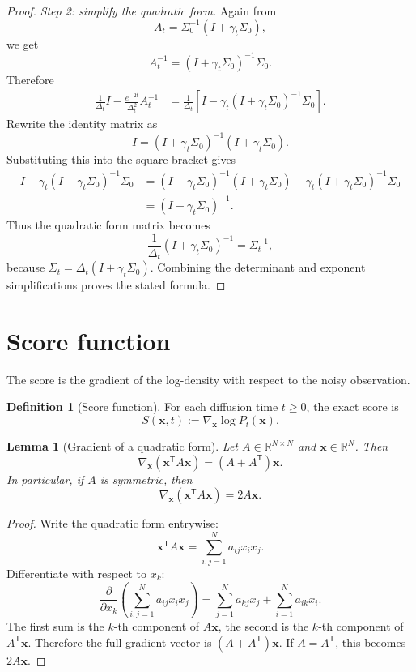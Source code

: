 \documentclass[11pt]{article}
\numberwithin{equation}{section}
\newtheorem{lemma}[theorem]{Lemma}
\theoremstyle{definition}
\newtheorem{definition}[theorem]{Definition}
\theoremstyle{remark}
\newcommand{\R}{\mathbb{R}}
\newcommand{\Id}{I}
\newcommand{\trans}{\mathsf{T}}
\begin{document}
\begin{proof}
\emph{Step 2: simplify the quadratic form.}
Again from
\[
A_t=\Sigma_0^{-1}(\Id+\gamma_t\Sigma_0),
\]
we get
\[
A_t^{-1}=(\Id+\gamma_t\Sigma_0)^{-1}\Sigma_0.
\]
Therefore
\begin{align*}
\frac{1}{\Delta_t}\Id-\frac{e^{-2t}}{\Delta_t^2}A_t^{-1}
&=
\frac{1}{\Delta_t}\left[\Id-\gamma_t(\Id+\gamma_t\Sigma_0)^{-1}\Sigma_0\right].
\end{align*}
Rewrite the identity matrix as
\[
\Id=(\Id+\gamma_t\Sigma_0)^{-1}(\Id+\gamma_t\Sigma_0).
\]
Substituting this into the square bracket gives
\begin{align*}
\Id-\gamma_t(\Id+\gamma_t\Sigma_0)^{-1}\Sigma_0
&=
(\Id+\gamma_t\Sigma_0)^{-1}(\Id+\gamma_t\Sigma_0)
-\gamma_t(\Id+\gamma_t\Sigma_0)^{-1}\Sigma_0 \\
&=
(\Id+\gamma_t\Sigma_0)^{-1}.
\end{align*}
Thus the quadratic form matrix becomes
\[
\frac{1}{\Delta_t}(\Id+\gamma_t\Sigma_0)^{-1}
=
\Sigma_t^{-1},
\]
because $\Sigma_t=\Delta_t(\Id+\gamma_t\Sigma_0)$. Combining the determinant and exponent simplifications proves the stated formula.
\end{proof}

\section{Score function}\label{sec:score}

The score is the gradient of the log-density with respect to the noisy observation.

\begin{definition}[Score function]
For each diffusion time $t\geq 0$, the exact score is
\[
S(\mathbf x,t):=\nabla_{\mathbf x}\log P_t(\mathbf x).
\]
\end{definition}

\begin{lemma}[Gradient of a quadratic form]\label{lem:grad_quad}
Let $A\in\R^{N\times N}$ and $\mathbf x\in\R^N$. Then
\[
\nabla_{\mathbf x}(\mathbf x^\trans A\mathbf x)=(A+A^\trans)\mathbf x.
\]
In particular, if $A$ is symmetric, then
\[
\nabla_{\mathbf x}(\mathbf x^\trans A\mathbf x)=2A\mathbf x.
\]
\end{lemma}

\begin{proof}
Write the quadratic form entrywise:
\[
\mathbf x^\trans A\mathbf x=\sum_{i,j=1}^N a_{ij}x_ix_j.
\]
Differentiate with respect to $x_k$:
\[
\frac{\partial}{\partial x_k}\left(\sum_{i,j=1}^N a_{ij}x_ix_j\right)
=
\sum_{j=1}^N a_{kj}x_j+\sum_{i=1}^N a_{ik}x_i.
\]
The first sum is the $k$-th component of $A\mathbf x$, the second is the $k$-th component of $A^\trans\mathbf x$. Therefore the full gradient vector is $(A+A^\trans)\mathbf x$. If $A=A^\trans$, this becomes $2A\mathbf x$.
\end{proof}
\end{document}
